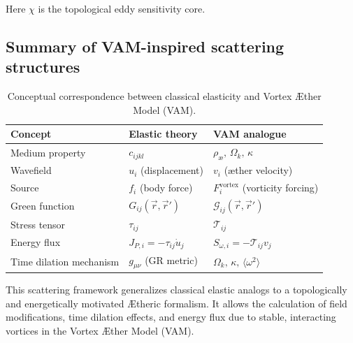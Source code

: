 \documentclass[preprint]{revtex4-2}
\begin{document}
Here \(\chi\) is the topological eddy sensitivity core.
\subsection{Summary of VAM-inspired scattering structures}

\begin{table}[H]
    \centering
    \begin{tabular}{lll}
        \toprule
    \textbf{Concept} & \textbf{Elastic theory} & \textbf{VAM analogue} \\
    \midrule
    Medium property & \( c_{ijkl} \) & \( \rho_\text{\ae},\, \Omega_k,\, \kappa \) \\
    Wavefield & \( u_i \) (displacement) & \( v_i \) (æther velocity) \\
    Source & \( f_i \) (body force) & \( F_i^\text{vortex} \) (vorticity forcing) \\
    Green function & \( G_{ij}(\vec{r}, \vec{r}') \) & \( \mathcal{G}_{ij}(\vec{r}, \vec{r}') \) \\
    Stress tensor & \( \tau_{ij} \) & \( \mathcal{T}_{ij} \) \\
    Energy flux & \( J_{P,i} = -\tau_{ij} \dot{u}_j \) & \( S_{\omega,i} = -\mathcal{T}_{ij} v_j \) \\
    Time dilation mechanism & \( g_{\mu\nu} \) (GR metric) & \( \Omega_k,\, \kappa,\, \langle \omega^2 \rangle \) \\
    \bottomrule
    \end{tabular}
    \caption{Conceptual correspondence between classical elasticity and Vortex Æther Model (VAM).}
    \label{tab:elastic-vam-analogy}
\end{table}

This scattering framework generalizes classical elastic analogs to a topologically and energetically motivated Ætheric formalism. It allows the calculation of field modifications, time dilation effects, and energy flux due to stable, interacting vortices in the Vortex Æther Model (VAM).
\end{document}
